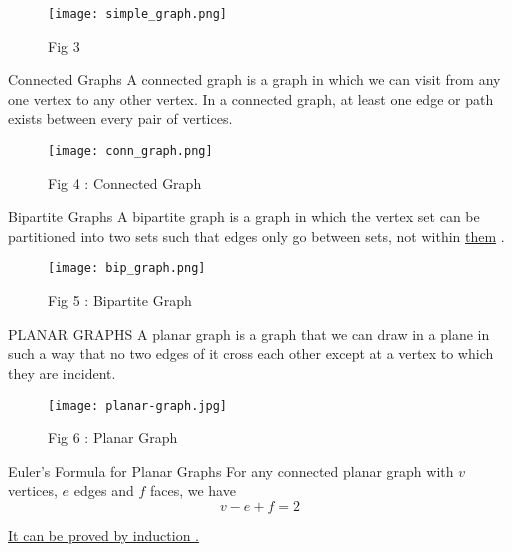 \documentclass[12pt]{beamer}
\begin{document}
\begin{frame}
\begin{figure}
\texttt{[image: simple\_graph.png]}
\caption{Fig 3}
\end{figure}

\end{frame}

\begin{frame}
\begin{block}{Connected Graphs}
A connected graph is a graph in which we can visit from any one vertex to any other vertex. In a connected graph, at least one edge or path exists between every pair of vertices.
\end{block}
\begin{figure}
\texttt{[image: conn\_graph.png]}
\caption{Fig 4 : Connected Graph}
\end{figure}
\end{frame}

\begin{frame}
\begin{block}{Bipartite Graphs}
A bipartite graph is a graph in which the vertex set can be partitioned into two sets such that edges only go between sets, not within \hyperlink{page.22}{them} .
\begin{figure}
\texttt{[image: bip\_graph.png]}
\caption{Fig 5 : Bipartite Graph}
\end{figure}

\end{block}
\end{frame}

\begin{frame}
\begin{block}{PLANAR GRAPHS}
A planar graph is a graph that we can draw in a plane in such a way that no two edges of it cross each other except at a vertex to which they are incident.

\end{block}
\begin{figure}
\texttt{[image: planar-graph.jpg]}
\caption{Fig 6 : Planar Graph}
\end{figure}
\end{frame}

\begin{frame}
\begin{block}{Euler's Formula for Planar Graphs}
For any connected planar graph with 
$v$ vertices, $e$ edges and $f$ faces, we have
$$ v-e+f=2 $$
\end{block}
\underline {It can be proved by induction .}
\end{frame}
\end{document}
